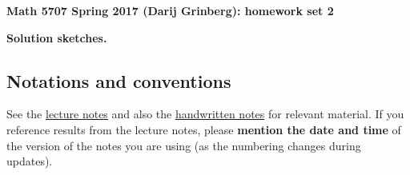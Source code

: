 \documentclass[numbers=enddot,12pt,final,onecolumn,notitlepage]{scrartcl}%
\theoremstyle{definition}
\begin{document}
\begin{center}
\textbf{Math 5707 Spring 2017 (Darij Grinberg): homework set 2}

\textbf{Solution sketches.}
\end{center}

\tableofcontents

\subsection{Notations and conventions}

See the
\href{http://www.cip.ifi.lmu.de/~grinberg/t/17s/nogra.pdf}{lecture notes}
and also the
\href{http://www.cip.ifi.lmu.de/~grinberg/t/17s/}{handwritten notes}
for relevant material.
If you reference results from the lecture notes, please \textbf{mention the date and time} of the version of the notes you are using (as the numbering changes during updates).
\end{document}
